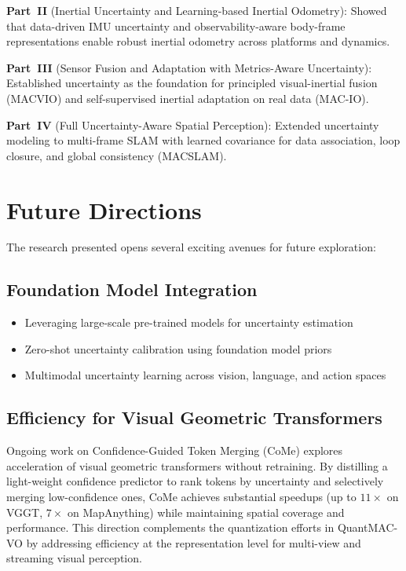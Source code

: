 \textbf{Part~II} (Inertial Uncertainty and Learning-based Inertial Odometry): Showed that data-driven IMU uncertainty and observability-aware body-frame representations enable robust inertial odometry across platforms and dynamics.

\textbf{Part~III} (Sensor Fusion and Adaptation with Metrics-Aware Uncertainty): Established uncertainty as the foundation for principled visual-inertial fusion (MACVIO) and self-supervised inertial adaptation on real data (MAC-IO).

\textbf{Part~IV} (Full Uncertainty-Aware Spatial Perception): Extended uncertainty modeling to multi-frame SLAM with learned covariance for data association, loop closure, and global consistency (MACSLAM).

\section{Future Directions}

The research presented opens several exciting avenues for future exploration:

\subsection{Foundation Model Integration}
\begin{itemize}
    \item Leveraging large-scale pre-trained models for uncertainty estimation
    \item Zero-shot uncertainty calibration using foundation model priors
    \item Multimodal uncertainty learning across vision, language, and action spaces
\end{itemize}

\subsection{Efficiency for Visual Geometric Transformers}
Ongoing work on Confidence-Guided Token Merging (CoMe) explores acceleration of visual geometric transformers without retraining. By distilling a light-weight confidence predictor to rank tokens by uncertainty and selectively merging low-confidence ones, CoMe achieves substantial speedups (up to $11\times$ on VGGT, $7\times$ on MapAnything) while maintaining spatial coverage and performance. This direction complements the quantization efforts in QuantMAC-VO by addressing efficiency at the representation level for multi-view and streaming visual perception.

